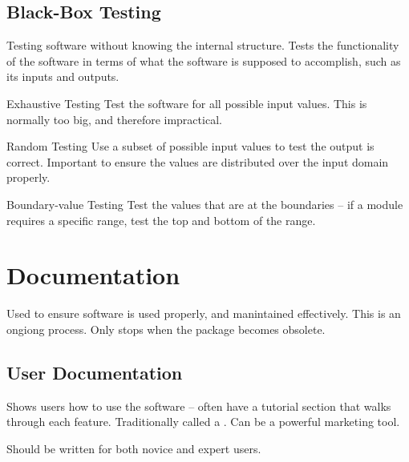 \documentclass[\main/notes.tex]{subfiles}
\begin{document}
			\subsection{Black-Box Testing}
				Testing software without knowing the internal structure. Tests the functionality of the software in terms of what the software is supposed to accomplish, such as its inputs and outputs.
				\begin{definition}{Exhaustive Testing}
					Test the software for all possible input values. This is normally too big, and therefore impractical.
				\end{definition}
				\begin{definition}{Random Testing}
						Use a subset of possible input values to test the output is correct. Important to ensure the values are distributed over the input domain properly.
				\end{definition}
				\begin{definition}{Boundary-value Testing}
					Test the values that are at the boundaries -- if a module requires a specific range, test the top and bottom of the range.
				\end{definition}

		\section{Documentation}
			Used to ensure software is used properly, and manintained effectively. This is an ongiong process. Only stops when the package becomes obsolete.
			\subsection{User Documentation}
				Shows users how to use the software -- often have a tutorial section that walks through each feature. Traditionally called a . Can be a powerful marketing tool.

				Should be written for both novice and expert users.
\end{document}

